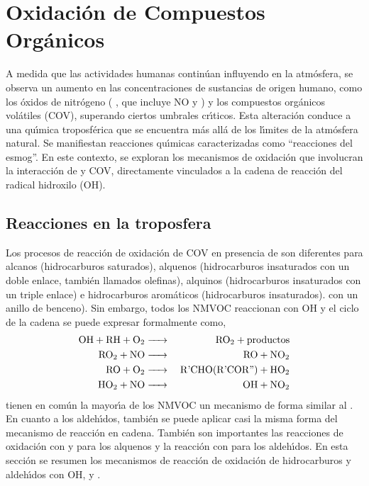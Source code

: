{\section{Oxidaci\'on de Compuestos Org\'anicos}
A medida que las actividades humanas contin\'uan influyendo en la atm\'osfera, se observa un aumento en las concentraciones de sustancias de origen humano, como los \'oxidos de nitr\'ogeno ( , que incluye NO y  ) y los compuestos org\'anicos vol\'atiles (COV), superando ciertos umbrales cr\'{\i}ticos. Esta alteraci\'on conduce a una qu\'{\i}mica troposf\'erica que se encuentra m\'as all\'a de los l\'{\i}mites de la atm\'osfera natural. Se manifiestan reacciones qu\'{\i}micas caracterizadas como ``reacciones del esmog''. En este contexto, se exploran los mecanismos de oxidaci\'on que involucran la interacci\'on de   y COV, directamente vinculados a la cadena de reacci\'on del radical hidroxilo (OH).

\subsection{Reacciones en la troposfera}
Los procesos de reacci\'on de oxidaci\'on de COV en presencia de   son diferentes para alcanos (hidrocarburos saturados), alquenos (hidrocarburos insaturados con un doble enlace, tambi\'en llamados olefinas), alquinos (hidrocarburos insaturados con un triple enlace) e hidrocarburos arom\'aticos (hidrocarburos insaturados). con un anillo de benceno). Sin embargo, todos los NMVOC reaccionan con OH y el ciclo de la cadena   se puede expresar formalmente como,
\begin{eqnarray*}
\ce{OH + RH + O2& -> & RO2 + productos \\
RO2 + NO & -> & RO + NO2\\
RO + O2 & -> & R\textrm{'}CHO(R\textrm{'}COR\textrm{''}) + HO2 \\
HO2 + NO & -> & OH + NO2}
\end{eqnarray*}
tienen en com\'un la mayor\'{\i}a de los NMVOC un mecanismo de forma similar al . En cuanto a los aldeh\'{\i}dos, tambi\'en se puede aplicar casi la misma forma del mecanismo de reacci\'on en cadena. Tambi\'en son importantes las reacciones de oxidaci\'on con  y  para los alquenos y la reacci\'on con   para los aldeh\'{\i}dos. En esta secci\'on se resumen los mecanismos de reacci\'on de oxidaci\'on de hidrocarburos y aldeh\'{\i}dos con OH,  y .

}
